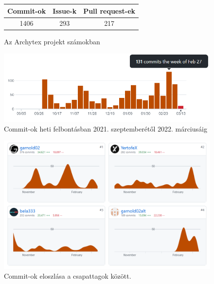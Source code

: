 \begin{figure}[H]
  \begin{center}
    \begin{tabular}{|c|c|c|}
      \hline
      Commit-ok & Issue-k & Pull request-ek \\
      \hline
      1406      & 293     & 217             \\
      \hline
    \end{tabular}
    \caption{Az Archytex projekt számokban}
  \end{center}
\end{figure}

\begin{figure}[H]
  \centering
  \includegraphics[width=.82\textwidth]{parts/developer-documentation/work/images/commits.png}
  \caption{Commit-ok heti felbontásban 2021. szeptemberétől 2022. márciusáig}
\end{figure}

\begin{figure}[H]
  \centering
  \includegraphics[width=.65\textwidth]{parts/developer-documentation/work/images/commit-frequency.png}
  \caption{Commit-ok eloszlása a csapattagok között.}
\end{figure}